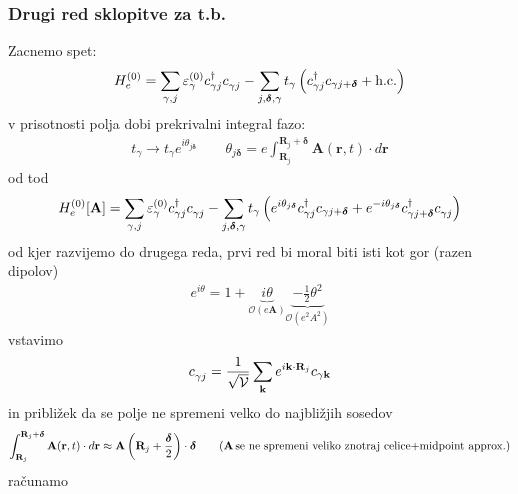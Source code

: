 \documentclass[a4paper,10pt]{article}
\renewcommand{\vec}[1]{\mathbf{#1}}
\begin{document}
\subsubsection{Drugi red sklopitve za t.b.}
Zacnemo spet:
\begin{align}
  H_e^{(0)} = \sum_{\gamma, j} \varepsilon_\gamma^{(0)} c_{\gamma j}^\dagger c_{\gamma j}^{\vphantom{\dagger}}- \sum_{j, \bm{\delta}, \gamma} t_\gamma \left( c_{\gamma j}^\dagger c_{\gamma j + \bm{\delta}} + \text{h.c.} \right)
\end{align}
v prisotnosti polja dobi prekrivalni integral fazo: 
\begin{align}
  t_\gamma \to t_\gamma e^{i \theta_{j\bm{\delta}}} \quad\quad \theta_{j\bm{\delta}} = e \int_{\vec{R}_j}^{\vec{R}_j + \bm{\delta}} \vec{A}(\vec{r}, t) \cdot d\vec{r}
\end{align}
od tod
\begin{align}
  H_e^{(0)}[\vec{A}] = \sum_{\gamma, j} \varepsilon_\gamma^{(0)} c_{\gamma j}^\dagger c_{\gamma j}^{\vphantom{\dagger}}- \sum_{j, \bm{\delta}, \gamma} t_\gamma \left( e^{i \theta_{j\bm{\delta}}} c_{\gamma j}^\dagger c_{\gamma j + \bm{\delta}} + e^{-i \theta_{j\bm{\delta}}} c_{\gamma j + \bm{\delta}}^\dagger c_{\gamma j}^{\vphantom{\dagger}}\right)
\end{align}
od kjer razvijemo do drugega reda, prvi red bi moral biti isti kot gor (razen dipolov)
\begin{align}
  e^{i \theta} = 1 + \underbrace{i \theta}_{\mathcal{O}(e\vec{A})} \underbrace{-\frac{1}{2}\theta^2}_{\mathcal{O}(e^2 A^2)}
\end{align}
vstavimo 
\begin{align}
  c_{\gamma j}^{\vphantom{\dagger}}= \frac{1}{\sqrt{\mathcal{V}}} \sum_{\vec{k}} e^{i \vec{k} \cdot \vec{R}_j} c_{\gamma \vec{k}}
\end{align}
in približek da se polje ne spremeni velko do najbližjih sosedov
\begin{align}
  \int_{\vec{R}_j}^{\vec{R}_j + \bm{\delta}} \vec{A}(\vec{r}, t) \cdot d\vec{r} \approx \vec{A}\left(\vec{R}_j + \frac{\bm{\delta}}{2}\right) \cdot \bm{\delta} \quad\quad (\vec{A} \text{\,se ne spremeni veliko znotraj celice+midpoint approx.})
\end{align}
računamo 
\end{document}
